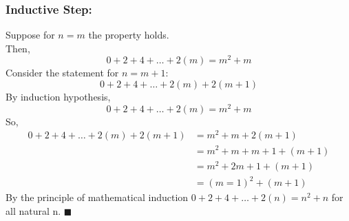 \documentclass{article}
\begin{document}
\begin{enumerate}
{                        \subsubsection*{Inductive Step:}
                        Suppose for $n=m$ the property holds.\\
                        Then, 
                        \begin{equation}
                                0+2+4+\ldots+2(m)=m^2+m
                        \end{equation}
                        Consider the statement for $n=m+1$:
                        \begin{equation}
                                0+2+4+\ldots+2(m)+2(m+1)
                        \end{equation}
                        By induction hypothesis,
                        \begin{equation}
                                0+2+4+\ldots+2(m)=m^2+m
                        \end{equation}
                        So,
                        \begin{equation}
                                \begin{split}
                                        0+2+4+\ldots+2(m)+2(m+1) &=m^2+m+2(m+1)\\
                                                                 &=m^2+m+m+1+(m+1)\\
                                                                 &=m^2+2m+1+(m+1)\\
                                                                 &=(m=1)^2+(m+1)
                                \end{split}
                        \end{equation}
                        By the principle of mathematical induction $0+2+4+\ldots+2(n)=n^2+n$ for all natural n. \hfill$\blacksquare$
                }
\end{enumerate}
\end{document}
